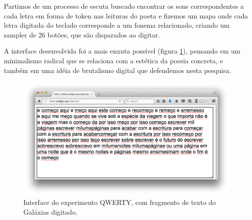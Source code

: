 Partimos de um processo de escuta buscado encontrar os sons correspondentes a cada letra em forma de token nas leituras do poeta e fizemos um mapa onde cada letra digitada do teclado corresponde a um fonema relacionado, criando um sampler de 26 botões, que são disparados ao digitar.

A interface desenvolvida foi a mais enxuta possível (figura \ref{qwerty}), pensando em um minimalismo radical que se relaciona com a estética da poesia concreta, e também em uma idéia de brutalismo digital que defendemos nesta pesquisa.

\begin{figure}[htb]
    \caption{\label{qwerty}Interface do experimento QWERTY, com fragmento de texto do Galáxias digitado. }
    \begin{center}
    \includegraphics[width=1\linewidth]{pictures/cap3/qwerty.png}
    \end{center}
\end{figure}





